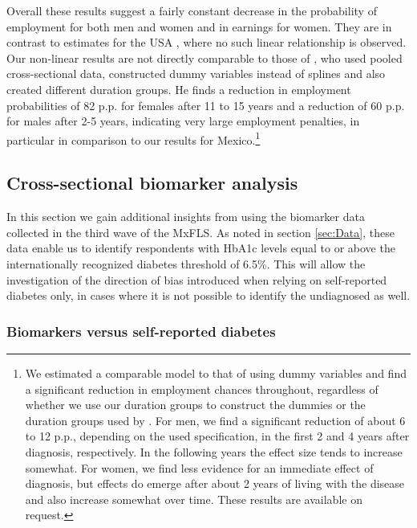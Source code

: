 \documentclass[12pt,english]{article}
\begin{document}
Overall these results suggest a fairly constant decrease in the probability of employment for both men and women and in earnings for women. They are in contrast to estimates for the \ac{USA} \parencite{Minor2013}, where no such linear relationship is observed. Our non-linear results are not directly comparable to those of \textcite{Minor2013}, who used pooled cross-sectional data, constructed dummy variables instead of splines and also created different duration groups. He finds a reduction in employment probabilities of 82 \ac{p.p.} for females after 11 to 15 years and a reduction of 60 \ac{p.p.} for males after 2-5 years, indicating very large employment penalties, in particular in comparison to our results for Mexico.\footnote{We estimated a comparable model to that of \textcite{Minor2013} using dummy variables and find a significant reduction in employment chances throughout, regardless of whether we use our duration groups to construct the dummies or the duration groups used by \textcite{Minor2013}. For men, we find a significant reduction of about 6 to 12 \ac{p.p.}, depending on the used specification, in the first 2 and 4 years after diagnosis, respectively. In the following years the effect size tends to increase somewhat. For women, we find less evidence for an immediate effect of diagnosis, but effects do emerge after about 2 years of living with the disease and also increase somewhat over time. These results are available on request.}
\FloatBarrier

\subsection{Cross-sectional biomarker analysis}


In this section we gain additional insights from using the biomarker data collected in the
third wave of the \ac{MxFLS}. As noted in section \ref{sec:Data}, these data enable us to identify respondents with
\ac{HbA1c} levels equal to or above the internationally recognized diabetes threshold of 6.5\%. This will allow the investigation of the direction of bias introduced when relying on self-reported diabetes only, in cases where it is not possible to identify the undiagnosed as well.

\subsubsection{Biomarkers versus self-reported diabetes}
\end{document}
